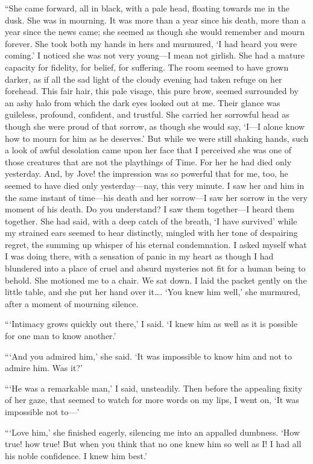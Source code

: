 \documentclass[12pt]{report}
\begin{document}
``She came forward, all in black, with a pale head, floating towards me
in the dusk. She was in mourning. It was more than a year since his
death, more than a year since the news came; she seemed as though she
would remember and mourn forever. She took both my hands in hers and
murmured, `I had heard you were coming.' I noticed she was not very
young---I mean not girlish. She had a mature capacity for fidelity, for
belief, for suffering. The room seemed to have grown darker, as if all
the sad light of the cloudy evening had taken refuge on her forehead.
This fair hair, this pale visage, this pure brow, seemed surrounded by
an ashy halo from which the dark eyes looked out at me. Their glance was
guileless, profound, confident, and trustful. She carried her sorrowful
head as though she were proud of that sorrow, as though she would say,
`I---I alone know how to mourn for him as he deserves.' But while we
were still shaking hands, such a look of awful desolation came upon her
face that I perceived she was one of those creatures that are not the
playthings of Time. For her he had died only yesterday. And, by Jove!
the impression was so powerful that for me, too, he seemed to have died
only yesterday---nay, this very minute. I saw her and him in the same
instant of time---his death and her sorrow---I saw her sorrow in the
very moment of his death. Do you understand? I saw them together---I
heard them together. She had said, with a deep catch of the breath, `I
have survived' while my strained ears seemed to hear distinctly, mingled
with her tone of despairing regret, the summing up whisper of his
eternal condemnation. I asked myself what I was doing there, with a
sensation of panic in my heart as though I had blundered into a place of
cruel and absurd mysteries not fit for a human being to behold. She
motioned me to a chair. We sat down. I laid the packet gently on the
little table, and she put her hand over it\ldots{}. `You knew him well,'
she murmured, after a moment of mourning silence.

```Intimacy grows quickly out there,' I said. `I knew him as well as it
is possible for one man to know another.'

```And you admired him,' she said. `It was impossible to know him and
not to admire him. Was it?'

\clearpage
```He was a remarkable man,' I said, unsteadily. Then before the
appealing fixity of her gaze, that seemed to watch for more words on my
lips, I went on, `It was impossible not to---'

```Love him,' she finished eagerly, silencing me into an appalled
dumbness. `How true! how true! But when you think that no one knew him
so well as I! I had all his noble confidence. I knew him best.'
\end{document}
